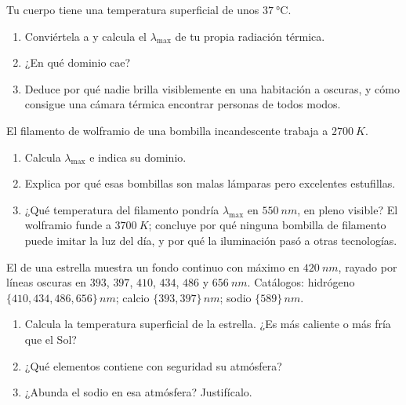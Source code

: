\begin{exercise}[$\star\star$]\label{exo:g10:light-spectra:11}
Tu cuerpo tiene una temperatura superficial de unos
$\qty{37}{\degreeCelsius}$.
\begin{enumerate}
  \item Conviértela a  y calcula el $\lambda_{\max}$ de tu propia
        radiación térmica.
  \item ¿En qué dominio cae?
  \item Deduce por qué nadie brilla visiblemente en una habitación a
        oscuras, y cómo consigue una cámara térmica encontrar personas
        de todos modos.
\end{enumerate}
\end{exercise}

\begin{exercise}[$\star\star\star$]\label{exo:g10:light-spectra:12}
El filamento de wolframio de una bombilla incandescente trabaja a
$\qty{2700}{K}$.
\begin{enumerate}
  \item Calcula $\lambda_{\max}$ e indica su dominio.
  \item Explica por qué esas bombillas son malas lámparas pero
        excelentes estufillas.
  \item ¿Qué temperatura del filamento pondría $\lambda_{\max}$ en
        $\qty{550}{nm}$, en pleno visible? El wolframio funde a
        $\qty{3700}{K}$; concluye por qué ninguna bombilla de filamento
        puede imitar la luz del día, y por qué la iluminación pasó a
        otras tecnologías.
\end{enumerate}
\end{exercise}

\begin{exercise}[$\star\star\star$]\label{exo:g10:light-spectra:13}
El  de una estrella muestra un fondo continuo con máximo en
$\qty{420}{nm}$, rayado por líneas oscuras en $393$, $397$, $410$,
$434$, $486$ y $\qty{656}{nm}$. Catálogos: hidrógeno
$\{410, 434, 486, 656\}\,\unit{nm}$; calcio $\{393, 397\}\,\unit{nm}$;
sodio $\{589\}\,\unit{nm}$.
\begin{enumerate}
  \item Calcula la temperatura superficial de la estrella. ¿Es más
        caliente o más fría que el Sol?
  \item ¿Qué elementos contiene con seguridad su atmósfera?
  \item ¿Abunda el sodio en esa atmósfera? Justifícalo.
\end{enumerate}
\end{exercise}

